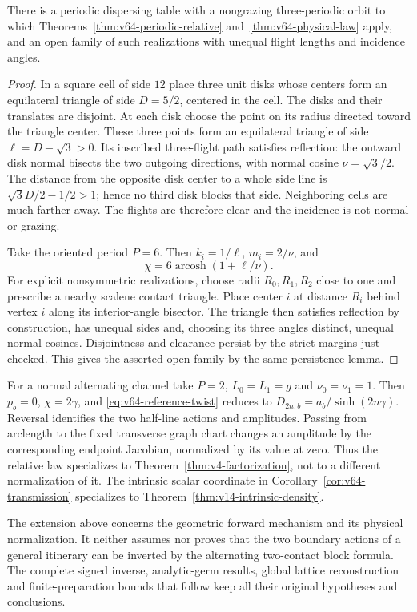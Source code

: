 \begin{proposition}
\label{prop:v64-triangle}
There is a periodic dispersing table with a nongrazing three-periodic
orbit to which Theorems~\ref{thm:v64-periodic-relative}
and~\ref{thm:v64-physical-law} apply, and an open family of such
realizations with unequal flight lengths and incidence angles.
\end{proposition}
\begin{proof}
In a square cell of side $12$ place three unit disks whose centers form
an equilateral triangle of side $D=5/2$, centered in the cell.
The disks and their translates are disjoint.  At each disk choose the
point on its radius directed toward the triangle center.  These three
points form an equilateral triangle of side
$\ell=D-\sqrt3>0$.  Its inscribed three-flight path satisfies reflection:
the outward disk normal bisects the two outgoing directions, with normal
cosine $\nu=\sqrt3/2$.  The distance from the opposite disk center to
a whole side line is $\sqrt3 D/2-1/2>1$; hence no third disk blocks
that side.  Neighboring cells are much farther away.  The flights are
therefore clear and the incidence is not normal or grazing.

Take the oriented period $P=6$.  Then $k_i=1/\ell$,
$m_i=2/\nu$, and
\[
 \chi=6\operatorname{arcosh}(1+\ell/\nu).
\]
For explicit nonsymmetric realizations, choose radii $R_0,R_1,R_2$ close to one and prescribe a nearby scalene
contact triangle.  Place center $i$ at distance $R_i$ behind vertex $i$
along its interior-angle bisector.  The triangle then satisfies reflection
by construction, has unequal sides and, choosing its three angles
distinct, unequal normal cosines.  Disjointness and clearance persist by
the strict margins just checked.  This gives the asserted open family
by the same persistence lemma.
\end{proof}

For a normal alternating channel take $P=2$, $L_0=L_1=g$ and
$\nu_0=\nu_1=1$.  Then $p_b=0$, $\chi=2\gamma$, and
\eqref{eq:v64-reference-twist} reduces to
$D_{2n,b}=a_b/\sinh(2n\gamma)$.  Reversal identifies the two
half-line actions and amplitudes.  Passing from arclength to the fixed
transverse graph chart changes an amplitude by the corresponding
endpoint Jacobian, normalized by its value at zero.  Thus the relative
law specializes to Theorem~\ref{thm:v4-factorization}, not to a different
normalization of it.  The intrinsic scalar coordinate in
Corollary~\ref{cor:v64-transmission} specializes to
Theorem~\ref{thm:v14-intrinsic-density}.

The extension above concerns the geometric forward mechanism and its
physical normalization.  It neither assumes nor proves that the two
boundary actions of a general itinerary can be inverted by the
alternating two-contact block formula.  The complete signed inverse,
analytic-germ results, global lattice reconstruction and finite-preparation
bounds that follow keep all their original hypotheses and conclusions.
